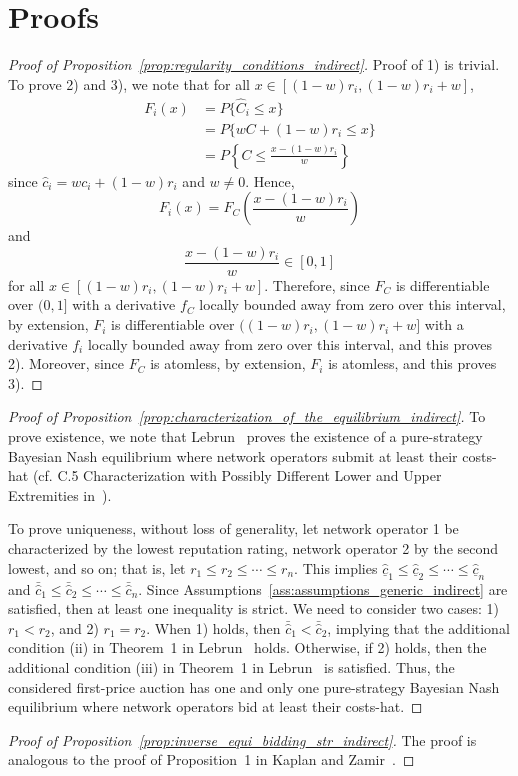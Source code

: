 \section{Proofs}
\label{sec:proofs_indirect}
\begin{proof}[Proof of Proposition~\ref{prop:regularity_conditions_indirect}]
Proof of 1) is trivial. To prove 2) and 3), we note that for all $x\in [(1-w)r_i, (1-w)r_i + w]$,
\begin{align*}
  F_i(x)
  &= P\{\hat{C}_i\le x\} \\
  &= P\{wC + (1-w)r_i\le x\} \\
  &= P\left\{ C\le \frac{x - (1-w)r_i}{w} \right\}
\end{align*}
since $\hat{c}_i = wc_i + (1-w)r_i$ and $w\neq 0$. Hence,
\begin{equation*}
  F_i(x) = F_C\left( \frac{x - (1-w)r_i}{w} \right)
\end{equation*}
and
\begin{equation*}
  \frac{x - (1-w)r_i}{w}\in [0,1]
\end{equation*}
for all $x\in [(1-w)r_i, (1-w)r_i + w]$. Therefore, since $F_C$ is differentiable over $(0,1]$ with a derivative $f_C$ locally bounded away from zero over this interval, by extension, $F_i$ is differentiable over $((1-w)r_i, (1-w)r_i + w]$ with a derivative $f_i$ locally bounded away from zero over this interval, and this proves 2). Moreover, since $F_C$ is atomless, by extension, $F_i$ is atomless, and this proves 3).
\end{proof}

\begin{proof}[Proof of Proposition~\ref{prop:characterization_of_the_equilibrium_indirect}]
To prove existence, we note that Lebrun~\cite{Lebrun2006} proves the existence of a pure-strategy Bayesian Nash equilibrium where network operators submit at least their costs-hat (cf. C.5 Characterization with Possibly Different Lower and Upper Extremities in~\cite{Lebrun2006}).

To prove uniqueness, without loss of generality, let network operator 1 be characterized by the lowest reputation rating, network operator 2 by the second lowest, and so on; that is, let $r_1 \leq r_2 \leq\cdots \leq r_n$. This implies $\underline{\hat{c}}_1 \leq \underline{\hat{c}}_2 \leq\cdots \leq \underline{\hat{c}}_n$ and $\bar{\hat{c}}_1 \leq \bar{\hat{c}}_2 \leq \cdots\leq \bar{\hat{c}}_n$. Since Assumptions~\ref{ass:assumptions_generic_indirect} are satisfied, then at least one inequality is strict. We need to consider two cases: 1) $r_1 < r_2$, and 2) $r_1 = r_2$. When 1) holds, then $\bar{\hat{c}}_1 < \bar{\hat{c}}_2$, implying that the additional condition (ii) in Theorem~1 in Lebrun~\cite{Lebrun2006} holds. Otherwise, if 2) holds, then the additional condition (iii) in Theorem~1 in Lebrun~\cite{Lebrun2006} is satisfied. Thus, the considered first-price auction has one and only one pure-strategy Bayesian Nash equilibrium where network operators bid at least their costs-hat.
\end{proof}

\begin{proof}[Proof of Proposition~\ref{prop:inverse_equi_bidding_str_indirect}]
The proof is analogous to the proof of Proposition~1 in Kaplan and Zamir~\cite{KaplanZamir2007}.
\end{proof}

